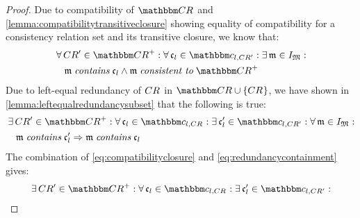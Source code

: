 \begin{proof}
    Due to compatibility of $\consistencyrelationset{CR}$ and \autoref{lemma:compatibilitytransitiveclosure} showing equality of compatibility for a consistency relation set and its transitive closure, we know that:
    \begin{align} \label{eq:compatibilityclosure}
        & \nonumber
        \forall \consistencyrelation{CR}{}' \in \transitiveclosure{\consistencyrelationset{CR}} : \forall \conditionelement{c}{l} \in \condition{c}{l, \consistencyrelation{CR}{}'} %
        : \exists \modeltuple{m} \in \metamodeltupleinstanceset{M} : \\
        & \formulaskip
        \modeltuple{m} \containsmath \conditionelement{c}{l} \land \modeltuple{m} \consistenttomath \transitiveclosure{\consistencyrelationset{CR}}
    \end{align}
    Due to left-equal redundancy of $\consistencyrelation{CR}{}$ in $\consistencyrelationset{CR} \cup \setted{\consistencyrelation{CR}{}}$, we have shown in \autoref{lemma:leftequalredundancysubset} that the following is true:
    \begin{align} \label{eq:redundancycontainment}
        & \nonumber 
        \exists \consistencyrelation{CR}{}' \in \transitiveclosure{\consistencyrelationset{CR}} : \forall \conditionelement{c}{l} \in \condition{c}{l, \consistencyrelation{CR}{}} : \exists \conditionelement{c}{l}' \in \condition{c}{l,\consistencyrelation{CR}{}'} : \forall \modeltuple{m} \in \metamodeltupleinstanceset{M} : \\
        & \formulaskip
        \modeltuple{m} \containsmath \conditionelement{c}{l}' \Rightarrow \modeltuple{m} \containsmath \conditionelement{c}{l}
    \end{align}
    The combination of \autoref{eq:compatibilityclosure} and \autoref{eq:redundancycontainment} gives:
    \begin{align*}
        & \nonumber 
        \exists \consistencyrelation{CR}{}' \in \transitiveclosure{\consistencyrelationset{CR}} : \forall \conditionelement{c}{l} \in \condition{c}{l, \consistencyrelation{CR}{}} : \exists \conditionelement{c}{l}' \in \condition{c}{l,\consistencyrelation{CR}{}'} : \\

\end{align*}
\end{proof}
